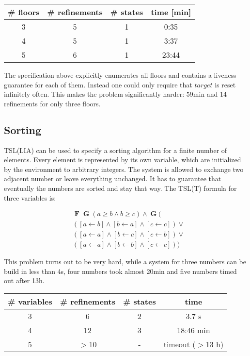 \documentclass[runningheads]{llncs}
\newcommand{\eventually}{\operatorname{\mathbf{F}}}
\newcommand{\globally}{\operatorname{\mathbf{G}}}
\begin{document}
\begin{center}
\begin{tabular}{ |c|c|c|c| } 
\hline
\# floors & \# refinements & \# states & time [min]\\
\hline
3  & 5 & 1 & 0:35 \\
4  & 5 & 1 & 3:37 \\ 
5  & 6 & 1 & 23:44 \\ 
\hline
\end{tabular}
\end{center}

The specification above explicitly enumerates all floors and contains a liveness guarantee for each of them.
Instead one could only require that $target$ is reset infinitely often.
This makes the problem significantly harder: 59min and 14 refinements for only three floors.

\subsection{Sorting}
TSL(LIA) can be used to specify a sorting algorithm for a finite number of elements.
Every element is represented by its own variable, which are initialized by the environment to arbitrary integers.
The system is allowed to exchange two adjacent number or leave everything unchanged.
It has to guarantee that eventually the numbers are sorted and stay that way.
The TSL(T) formula for three variables is:

\begin{align*}
&\eventually \globally (a \geq b \land b \geq c) \land \globally(\\
&([a \leftarrow b] \land [b \leftarrow a] \land [c \leftarrow c]) \lor\\
&([a \leftarrow a] \land [b \leftarrow c] \land [c \leftarrow b]) \lor \\
&([a \leftarrow a] \land [b \leftarrow b] \land [c \leftarrow c]))
\end{align*}

This problem turns out to be very hard, while a system for three numbers can be build in less than 4s, four numbers took almost 20min and five numbers timed out after 13h.

\begin{center}
\begin{tabular}{ |c|c|c|c| } 
\hline
\# variables & \# refinements & \# states & time\\
\hline
3  & 6 & 2 & 3.7 s \\
4  & 12 & 3 & 18:46 min \\ 
5  & $>$10 & - & timeout ($>$13 h) \\ 
\hline
\end{tabular}
\end{center}
\end{document}
